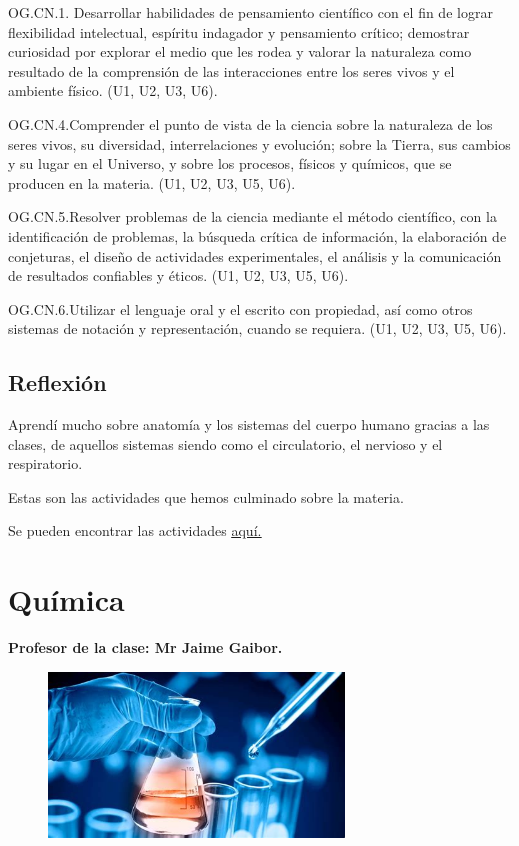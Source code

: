 \documentclass[a4paper, 12pt]{article}
\begin{document}
OG.CN.1. Desarrollar habilidades de pensamiento científico con el fin de lograr flexibilidad intelectual, espíritu indagador y pensamiento crítico; demostrar curiosidad por explorar el medio que les rodea y valorar la naturaleza como resultado de la comprensión de las interacciones entre los seres vivos y el ambiente físico. (U1, U2, U3, U6).

OG.CN.4.Comprender el punto de vista de la ciencia sobre la naturaleza de los seres vivos, su diversidad, interrelaciones y evolución; sobre la Tierra, sus cambios y su lugar en el Universo, y sobre los procesos, físicos y químicos, que se producen en la materia. (U1, U2, U3, U5, U6).

OG.CN.5.Resolver problemas de la ciencia mediante el método científico, con la identificación de problemas, la búsqueda crítica de información, la elaboración de conjeturas, el diseño de actividades experimentales, el análisis y la comunicación de resultados confiables y éticos. (U1, U2, U3, U5, U6).

OG.CN.6.Utilizar el lenguaje oral y el escrito con propiedad, así como otros sistemas de notación y representación, cuando se requiera. (U1, U2, U3, U5, U6).

\subsection{Reflexión}
Aprendí mucho sobre anatomía y los sistemas del cuerpo humano gracias a las clases, de aquellos sistemas siendo como el circulatorio, el nervioso y el respiratorio.

Estas son las actividades que hemos culminado sobre la materia.

Se pueden encontrar las actividades \href{https://drive.google.com/drive/folders/1YKD8CT8OZtmeYhkY7_T-5Bcr-CvnnMNm?usp=sharing}{\underline{aquí.}}

\section{Química}
\textbf{Profesor de la clase: Mr Jaime Gaibor.}

\begin{figure}[h]
  \includegraphics[width=0.7\textwidth, center]{quimica.jpeg}
\end{figure}
\end{document}
